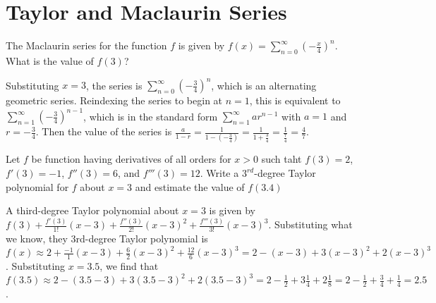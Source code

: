 \chapter{Taylor and Maclaurin Series}


\begin{Exercise} The Maclaurin series for the 
function $f$ is given by $f(x) = \sum_{n=0}^\infty \left( -\frac{x}{4} \right)^
n$. What is the value of $f(3)$?
\end{Exercise}

\begin{Answer}[ref = mac1]
Substituting $x = 3$, the series is $\sum_{n=0}^\infty \left( -\frac{3}{4} 
\right)^n$, which is an alternating geometric series. Reindexing the series to 
begin at $n = 1$, this is equivalent to $\sum_{n = 1}^\infty \left( - 
\frac{3}{4} \right) ^ {n - 1}$, which is in the standard form $\sum_{n=1}^
\infty ar^{n-1}$ with $a = 1$ and $r = -\frac{3}{4}$. Then the value of the 
series is $\frac{a}{1-r} = \frac{1}{1-\left(- \frac{3}{4} \right)} = \frac{1}{1 
+ \frac{3}{4}} = \frac{1}{\frac{7}{4}} = \frac{4}{7}$. 
\end{Answer}

\begin{Exercise} Let $f$ be function having 
derivatives of all orders for $x > 0$ such taht $f(3) = 2$, $f'(3) = -1$, 
$f''(3) = 6$, and $f'''(3) = 12$. Write a $3^{rd}$-degree Taylor polynomial 
for $f$ about $x = 3$ and estimate the value of $f(3.4)$
\end{Exercise}

\begin{Answer}[ref = taylor1]
A third-degree Taylor polynomial about $x = 3$ is given by $f(3) + \frac{
f'(3)}{1!} (x - 3) + \frac{f''(3)}{2!} (x - 3) ^ 2 + \frac{f'''(3)}{3!} (x - 3) 
^ 3$. Substituting what we know, they 3rd-degree Taylor polynomial is $f(x) 
\approx 2 + \frac{-1}{1} (x - 3) + \frac{6}{2} (x - 3) ^ 2 + \frac{12}{6}(x - 
3) ^ 3 = 2 - (x - 3) + 3 (x - 3) ^ 2 + 2 (x - 3) ^ 3$. Substituting $x = 3.5$, 
we find that $f(3.5) \approx 2 - (3.5 - 3) + 3 ( 3.5 - 3) ^ 2 + 2 (3.5 - 3) ^ 3 
= 2 - \frac{1}{2} + 3 \frac{1}{4} + 2\frac{1}{8} = 2 - \frac{1}{2} + 
\frac{3}{4} + \frac{1}{4} = 2.5$.
\end{Answer}

